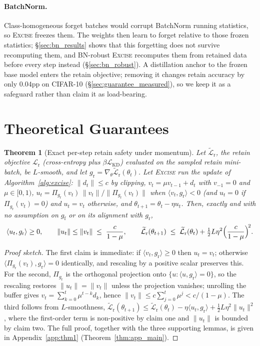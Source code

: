 \documentclass{article}
\newcommand{\ours}{\textsc{Excise}}
\newcommand{\gf}{g_{\mathrm{f}}}
\newcommand{\gr}{g_{\mathrm{r}}}
\newcommand{\lossr}{\mathcal{L}_{\mathrm{r}}}
\newcommand{\losskd}{\mathcal{L}_{\mathrm{KD}}}
\newcommand{\Lrt}{\widetilde{\mathcal{L}}_{\mathrm{r}}}
\newcommand{\added}[1]{{\color{revised}#1}}
\newcommand{\rev}[1]{{\color{revisedB}#1}}
\newtheorem{theorem}{Theorem}
\theoremstyle{remark}
\theoremstyle{plain}
\begin{document}
\paragraph{BatchNorm.}\label{sec:bn}
Class-homogeneous forget batches would corrupt BatchNorm running statistics, so
\ours{} freezes them. \added{The weights then learn to forget relative to those
frozen statistics; \S\ref{sec:bn_results} shows that this forgetting does not
survive recomputing them, and BN-robust \ours{} recomputes them from retained
data before every step instead (\S\ref{sec:bn_robust}).} A distillation anchor to
the frozen base model \rev{enters the retain objective; removing it changes
retain accuracy by only $0.04$pp on CIFAR-10 (\S\ref{sec:guarantee_measured}),
so we keep it as a safeguard rather than claim it as load-bearing}.

\section{Theoretical Guarantees}\label{sec:theory}

\begin{theorem}[Exact per-step retain safety under momentum]\label{thm:retain_safety}
Let \rev{$\Lrt$, the retain objective $\lossr$ (cross-entropy plus
$\beta\losskd$) evaluated on the sampled retain mini-batch,} be $L$-smooth, and
let $\gr = \nabla_\theta\Lrt(\theta_t)$. Let \ours{} run the update of
Algorithm~\ref{alg:excise}: $\|d_t\| \le c$ by clipping,
$v_t = \mu v_{t-1} + d_t$ with $v_{-1}=0$ and $\mu \in [0,1)$,
$u_t = \Pi_{\gr}(v_t)\,\|v_t\|/\|\Pi_{\gr}(v_t)\|$ when
$\langle v_t,\gr\rangle<0$ \rev{(and $u_t=0$ if $\Pi_{\gr}(v_t)=0$)} and
$u_t = v_t$ otherwise, and $\theta_{t+1} = \theta_t - \eta u_t$. Then, exactly
and \rev{with no assumption on $\gf$ or on its alignment with $\gr$},
\begin{equation}\label{eq:thm1}
\langle u_t,\gr\rangle \ge 0,
\qquad \|u_t\| \;\rev{\le}\; \|v_t\| \;\le\; \frac{c}{1-\mu},
\qquad \Lrt(\theta_{t+1}) \;\le\; \Lrt(\theta_t) + \tfrac{1}{2}L\eta^2\Big(\frac{c}{1-\mu}\Big)^{\!2}.
\end{equation}
\end{theorem}

\begin{proof}[Proof sketch]
The first claim is immediate: if $\langle v_t,\gr\rangle \ge 0$ then $u_t=v_t$;
otherwise $\langle \Pi_{\gr}(v_t),\gr\rangle = 0$ identically, and rescaling by
a positive scalar preserves this. For the second, $\Pi_{\gr}$ is the orthogonal
projection onto $\{u : \langle u,\gr\rangle = 0\}$, so the rescaling restores
$\|u_t\|=\|v_t\|$ \rev{unless the projection vanishes}; unrolling the buffer gives
$v_t = \sum_{k=0}^{t}\mu^{t-k}d_k$, hence
$\|v_t\| \le c\sum_{j=0}^{t}\mu^{j} < c/(1-\mu)$. The third follows from
$L$-smoothness,
$\Lrt(\theta_{t+1}) \le \Lrt(\theta_t) - \eta\langle u_t,\gr\rangle
+ \tfrac{1}{2}L\eta^2\|u_t\|^2$, where the first-order term is non-positive by
claim one and $\|u_t\|$ is bounded by claim two. The full proof, together with the three supporting lemmas, is given in Appendix~\ref{app:thm1} (Theorem~\ref{thm:app_main}).
\end{proof}
\end{document}
